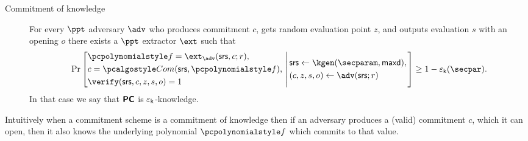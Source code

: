 \documentclass[runningheads,11pt]{llncs}
\begin{document}
\begin{description}
\item[Commitment of knowledge] For every $\ppt$ adversary $\adv$ who produces
  commitment $c$, gets random evaluation point $z$, and outputs evaluation $s$
  with an opening $o$ there exists a $\ppt$ extractor $\ext$ such that
\[
  \Pr \left[
    \begin{aligned}
      & \p{f} = \ext_\adv(\srs, c; r),\\
      & c = \com(\srs, \p{f}),\\
      & \verify(\srs, c, z, s, o) = 1
    \end{aligned}
    \,\left|\,
      \vphantom{
        \begin{aligned}
          & \\
          & \\
          &
        \end{aligned}
        }
    \begin{aligned}
      & \srs \gets \kgen(\secparam, \maxdeg),\\
      & (c, z, s, o) \gets \adv(\srs; r)
    \end{aligned}
  \right.\right]
  \geq 1 - \epsk(\secpar).
\]
In that case we say that $\bm{\mathsf{PC}}$ is $\varepsilon_{\mathsf{k}}$-knowledge.
\end{description}
Intuitively when a commitment scheme is a commitment of knowledge then if an
adversary produces a (valid) commitment $c$, which it can open, then it also
knows the underlying polynomial $\p{f}$ which commits to that value.
\end{document}
